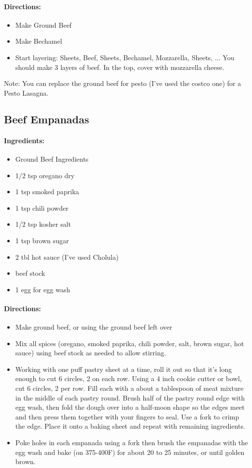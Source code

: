 \documentclass{article}
\begin{document}
\paragraph{Directions:}
\begin{itemize}
  \item Make Ground Beef
  \item Make Bechamel
  \item Start layering: Sheets, Beef, Sheets, Bechamel, Mozzarella, Sheets, ... You should make 3 layers of beef. In the top, cover with mozzarella cheese.
\end{itemize}

Note: You can replace the ground beef for pesto (I’ve used the costco one) for a Pesto Lasagna.

\subsection{Beef Empanadas}
\paragraph{Ingredients:}
\begin{itemize}
  \item Ground Beef Ingredients
  \item 1/2 tsp oregano dry
  \item 1 tsp smoked paprika
  \item 1 tsp chili powder
  \item 1/2 tsp kosher salt
  \item 1 tsp brown sugar
  \item 2 tbl hot sauce (I’ve used Cholula)
  \item beef stock
  \item 1 egg for egg wash
\end{itemize}

\paragraph{Directions:}
\begin{itemize}
  \item Make ground beef, or using the ground beef left over
  \item Mix all spices (oregano, smoked paprika, chili powder, salt, brown sugar, hot sauce) using beef
stock as needed to allow stirring.
  \item Working with one puff pastry sheet at a time, roll it out so that it’s long enough to cut 6 circles, 2 on each
row. Using a 4 inch cookie cutter or bowl, cut 6 circles, 2 per row. Fill each with a about a tablespoon
of meat mixture in the middle of each pastry round. Brush half of the pastry round edge with egg wash,
then fold the dough over into a half-moon shape so the edges meet and then press them together with
your fingers to seal. Use a fork to crimp the edge. Place it onto a baking sheet and repeat with remaining
ingredients.
  \item Poke holes in each empanada using a fork then brush the empanadas with the egg wash and bake (on 375-400F) for about 20 to 25 minutes, or until golden brown.
\end{itemize}
\end{document}
